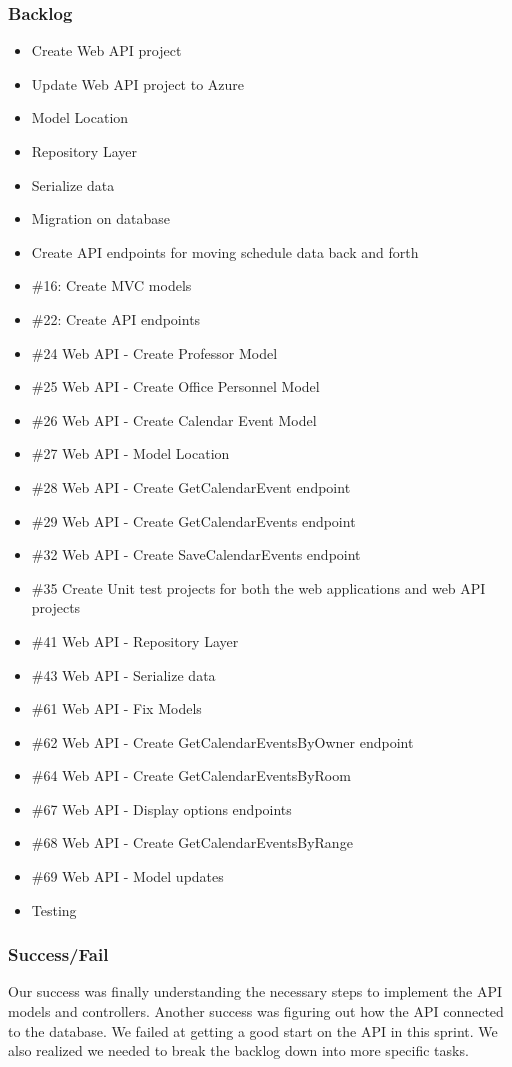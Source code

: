 \subsubsection{Backlog}
\begin{itemize}
\item Create Web API project
\item Update Web API project to Azure
\item Model Location
\item Repository Layer
\item Serialize data
\item Migration on database
\item Create API endpoints for moving schedule data back and forth
\item \#16: Create MVC models
\item \#22: Create API endpoints
\item \#24 Web API - Create Professor Model
\item \#25 Web API - Create Office Personnel Model
\item \#26 Web API - Create Calendar Event Model
\item \#27 Web API - Model Location
\item \#28 Web API - Create GetCalendarEvent endpoint
\item \#29 Web API - Create GetCalendarEvents endpoint
\item \#32 Web API - Create SaveCalendarEvents endpoint
\item \#35 Create Unit test projects for both the web applications and web API projects
\item \#41 Web API - Repository Layer
\item \#43 Web API - Serialize data
\item \#61 Web API - Fix Models
\item \#62 Web API - Create GetCalendarEventsByOwner endpoint
\item \#64 Web API - Create GetCalendarEventsByRoom
\item \#67 Web API - Display options endpoints
\item \#68 Web API - Create GetCalendarEventsByRange
\item \#69 Web API - Model updates
\item Testing
\end{itemize}

\subsubsection{Success/Fail}
Our success was finally understanding the necessary steps to implement the API models and controllers. Another success was figuring out how the API connected to the database. We failed at getting a good start on the API in this sprint. We also realized we needed to break the backlog down into more specific tasks.


